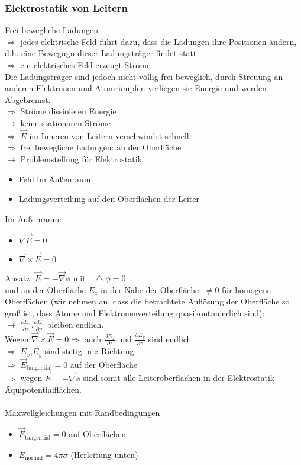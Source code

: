 \documentclass[a4paper]{article}
\newcommand*\laplace{\mathop{}\!\mathbin\bigtriangleup}
\begin{document}
\subsubsection{Elektrostatik von Leitern}
Frei bewegliche Ladungen\\
$\Rightarrow$ jedes elektrische Feld führt dazu, dass die Ladungen ihre
Positionen ändern, d.h. eine Bewegugn dieser Ladungsträger findet statt\\
$\Rightarrow$ ein elektrisches Feld erzeugt Ströme \\
Die Ladungsträger sind jedoch nicht völlig frei beweglich, durch Streuung an
anderen Elektronen und Atomrümpfen verliegen sie Energie und werden
Abgebremst.\\
$\Rightarrow$ Ströme dissioieren Energie\\
$\rightarrow$ keine \underline{stationären} Ströme\\
$\Rightarrow$ $\vec{E}$ im Inneren von Leitern verschwindet schnell\\
$\Rightarrow$ frei bewegliche Ladungen: an der Oberfläche\\
$\rightarrow$ Problemstellung für Elektrostatik
\begin{itemize}
  \item Feld im Außenraum
  \item Ladungsverteilung auf den Oberflächen der Leiter
\end{itemize}
Im Außenraum:
\begin{itemize}
  \item $\vec{\nabla}\vec{E}=0$
  \item $\vec{\nabla}\times\vec{E}=0$
\end{itemize} 
Ansatz: $\vec{E}=-\vec{\nabla}\phi$ mit $\laplace \phi=0$\\
und an der Oberfläche
$E_z$ in der Nähe der Oberfläche: $\neq0$
für homogene Oberflächen (wir nehmen an, dass die betrachtete Auflösung der
Oberfläche so groß ist, dass Atome und Elektronenverteilung quasikontnuierlich
sind):\\
$\rightarrow$ $\frac{\partial E_z}{\partial x}$,$\frac{\partial E_z}{\partial
y}$ bleiben endlich.\\
Wegen $\vec{\nabla}\times\vec{E}=0 \Rightarrow$ auch $\frac{\partial
E_x}{\partial z}$ und $\frac{\partial E_y}{\partial z}$ sind endlich\\
$\Rightarrow$ $E_x$,$E_y$ sind stetig in $z$-Richtung\\
$\Rightarrow$ $\vec{E}_{\text{tangential}}=0$ auf der Oberfläche\\
$\Rightarrow$ wegen $\vec{E}=-\vec{\nabla}\phi$ sind somit alle
Leiteroberflächen in der Elektrostatik Äquipotentialflächen.\\
 \\
Maxwellgleichungen mit Randbedingungen
\begin{itemize}
  \item $\vec{E}_{\text{tangential}}=0$ auf Oberflächen
  \item $E_{\text{normal}}=4\pi\sigma$ (Herleitung unten)
\end{itemize}
\end{document}
